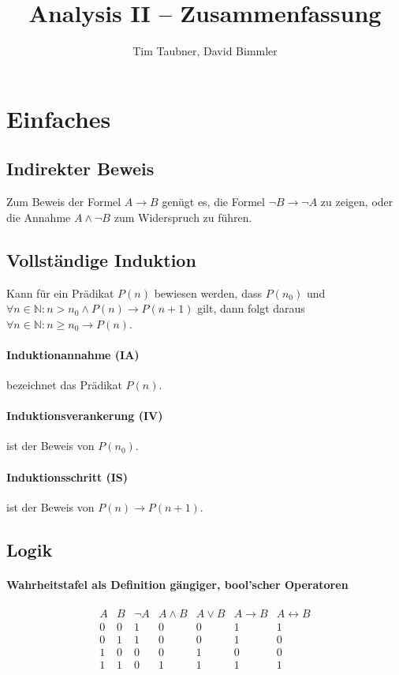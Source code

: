 \documentclass[a4paper, 9pt, DIV=24]{scrartcl}
\title{Analysis II -- Zusammenfassung}
\author{Tim Taubner, David Bimmler}
\newcommand{\N}{\mathbb{N}}
\begin{document}
\pagestyle{fancy}
\fancyhf{}

\begin{twocolumn}
\tableofcontents
\end{twocolumn}

\clearpage

\section{Einfaches}
\subsection{Indirekter Beweis}
Zum Beweis der Formel $A \to B$ genügt es, die Formel ${\lnot B \to \lnot A}$ zu zeigen, oder die Annahme $A \land \lnot B$ zum Widerspruch zu führen.
\subsection{Vollständige Induktion}
Kann für ein Prädikat $P(n)$ bewiesen werden, dass $P(n_0)$ und $\forall n\in\N: n > n_0 \wedge P(n) \rightarrow P(n+1)$ gilt,
dann folgt daraus $\forall n\in\N: n \geq n_0 \rightarrow P(n)$.
\paragraph{Induktionannahme (IA)} bezeichnet das Prädikat $P(n)$.
\paragraph{Induktionsverankerung (IV)} ist der Beweis von $P(n_0)$.
\paragraph{Induktionsschritt (IS)} ist der Beweis von $P(n) \rightarrow P(n+1)$.

\subsection{Logik}
\paragraph{Wahrheitstafel als Definition gängiger, bool'scher Operatoren}
\[
\begin{array}{ccccccc}
A&B&\neg A&A \wedge B&A \vee B & A \rightarrow B & A \leftrightarrow B \\\hline
0&0&1&0&0&1&1\\\hline
0&1&1&0&0&1&0\\\hline
1&0&0&0&1&0&0\\\hline
1&1&0&1&1&1&1\\
\end{array}
\]
\end{document}
